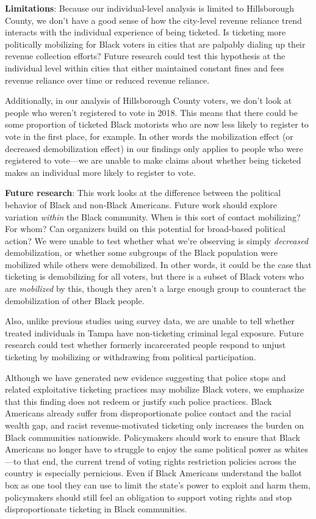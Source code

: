 \documentclass[
  12pt,
]{article}
\begin{document}
\textbf{Limitations}: Because our individual-level analysis is limited to Hillsborough County, we don't have a good sense of how the city-level revenue reliance trend interacts with the individual experience of being ticketed. Is ticketing more politically mobilizing for Black voters in cities that are palpably dialing up their revenue collection efforts? Future research could test this hypothesis at the individual level within cities that either maintained constant fines and fees revenue reliance over time or reduced revenue reliance.

Additionally, in our analysis of Hillsborough County voters, we don't look at people who weren't registered to vote in 2018. This means that there could be some proportion of ticketed Black motorists who are now less likely to register to vote in the first place, for example. In other words the mobilization effect (or decreased demobilization effect) in our findings only applies to people who were registered to vote---we are unable to make claims about whether being ticketed makes an individual more likely to register to vote.

\textbf{Future research}: This work looks at the difference between the political behavior of Black and non-Black Americans. Future work should explore variation \emph{within} the Black community. When is this sort of contact mobilizing? For whom? Can organizers build on this potential for broad-based political action? We were unable to test whether what we're observing is simply \emph{decreased} demobilization, or whether some subgroups of the Black population were mobilized while others were demobilized. In other words, it could be the case that ticketing is demobilizing for all voters, but there is a subset of Black voters who are \emph{mobilized} by this, though they aren't a large enough group to counteract the demobilization of other Black people.

Also, unlike previous studies using survey data, we are unable to tell whether treated individuals in Tampa have non-ticketing criminal legal exposure. Future research could test whether formerly incarcerated people respond to unjust ticketing by mobilizing or withdrawing from political participation.

Although we have generated new evidence suggesting that police stops and related exploitative ticketing practices may mobilize Black voters, we emphasize that this finding does not redeem or justify such police practices. Black Americans already suffer from disproportionate police contact and the racial wealth gap, and racist revenue-motivated ticketing only increases the burden on Black communities nationwide. Policymakers should work to ensure that Black Americans no longer have to struggle to enjoy the same political power as whites---to that end, the current trend of voting rights restriction policies across the country is especially pernicious. Even if Black Americans understand the ballot box as one tool they can use to limit the state's power to exploit and harm them, policymakers should still feel an obligation to support voting rights and stop disproportionate ticketing in Black communities.
\end{document}
